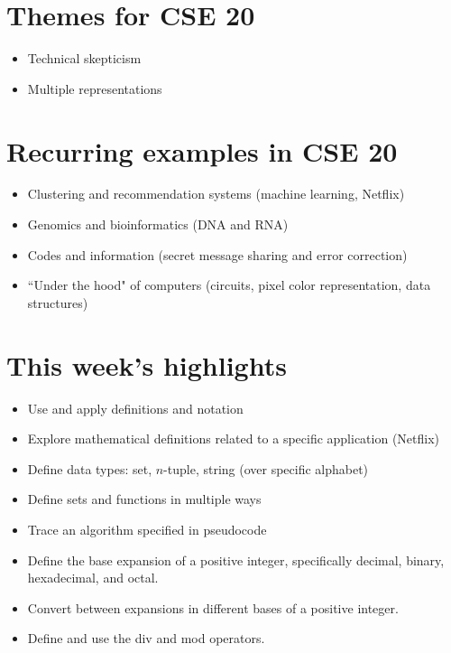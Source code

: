 \documentclass[12pt, oneside]{article}
\begin{document}
\begin{flushright}
\end{flushright}

\newpage
\section*{Themes for CSE 20}
\begin{itemize}
\item Technical skepticism
\item Multiple representations
\end{itemize}

\section*{Recurring examples in CSE 20}
\begin{itemize}
\item Clustering and recommendation systems (machine learning, Netflix)
\item Genomics and bioinformatics (DNA and RNA)
\item Codes and information (secret message sharing and error correction)
\item ``Under the hood" of computers (circuits, pixel color representation, data structures)
\end{itemize}

\section*{This week's highlights}
\begin{itemize}
\item Use and apply definitions and notation
\item Explore mathematical definitions related to a specific application (Netflix)
\item Define data types: set, $n$-tuple, string (over specific alphabet)
\item Define sets and functions in multiple ways
\item Trace an algorithm specified in pseudocode
\item Define the base expansion of a positive integer, specifically decimal, binary, hexadecimal, and octal.
\item Convert between expansions in different bases of a positive integer.
\item Define and use the div and mod operators.
\end{itemize}
\end{document}
